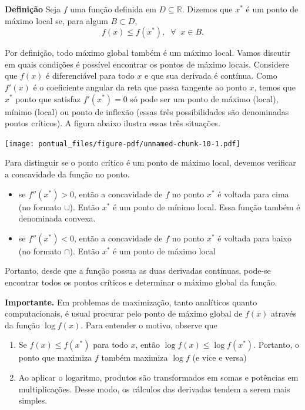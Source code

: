 \documentclass[
  letterpaper,
  DIV=11,
  numbers=noendperiod]{scrartcl}
\begin{document}
\textbf{Definição} Seja \(f\) uma função definida em
\(D\subseteq \mathbb{R}\). Dizemos que \(x^{*}\) é um ponto de máximo
local se, para algum \(B\subset D\),
\[f(x)\leq f(x^{*}),\;\;\forall\;\;x\in B.\]

Por definição, todo máximo global também é um máximo local. Vamos
discutir em quais condições é possível encontrar os pontos de máximo
locais. Considere que \(f(x)\) é diferenciável para todo \(x\) e que sua
derivada é contínua. Como \(f'(x)\) é o coeficiente angular da reta que
passa tangente ao ponto \(x\), temos que \(x^*\) ponto que satisfaz
\(f'(x^*)=0\) só pode ser um ponto de máximo (local), mínimo (local) ou
ponto de inflexão (essas três possibilidades são denominadas pontos
críticos). A figura abaixo ilustra essas três situações.

\texttt{[image: pontual\_files/figure-pdf/unnamed-chunk-10-1.pdf]}

Para distinguir se o ponto crítico é um ponto de máximo local, devemos
verificar a concavidade da função no ponto.

\begin{itemize}
\item
  se \(f''(x^*)>0\), então a concavidade de \(f\) no ponto \(x^*\) é
  voltada para cima (no formato \(\cup\)). Então \(x^*\) é um ponto de
  mínimo local. Essa função também é denominada convexa.
\item
  se \(f''(x^*)<0\), então a concavidade de \(f\) no ponto \(x^*\) é
  voltada para baixo (no formato \(\cap\)). Então \(x^*\) é um ponto de
  máximo local
\end{itemize}

Portanto, desde que a função possua as duas derivadas contínuas, pode-se
encontrar todos os pontos críticos e determinar o máximo global da
função.

\textbf{Importante.} Em problemas de maximização, tanto analíticos
quanto computacionais, é usual procurar pelo ponto de máximo global de
\(f(x)\) através da função \(\log f(x)\). Para entender o motivo,
observe que

\begin{enumerate}
\def\labelenumi{\arabic{enumi}.}
\item
  Se \(f(x)\leq f(x^*)\) para todo \(x\), então
  \(\log f(x)\leq \log f(x^*)\). Portanto, o ponto que maximiza \(f\)
  também maximiza \(\log f\) (e vice e versa)
\item
  Ao aplicar o logaritmo, produtos são transformados em somas e
  potências em multiplicações. Desse modo, os cálculos das derivadas
  tendem a serem mais simples.\\
\end{enumerate}
\end{document}
